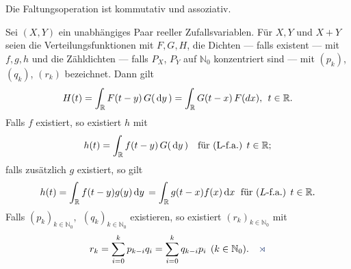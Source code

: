 \begin{prop}
\label{prop:6.8}
\begin{propenum}
\item Die Faltungsoperation ist kommutativ und assoziativ.
\item
Sei $(X,Y)$ ein unabhängiges Paar reeller Zufallsvariablen. Für $X,Y$ und
$X+Y$ seien die Verteilungsfunktionen mit $F,G,H$, die Dichten --- falls existent --- mit
$f,g,h$ und die Zähldichten --- falls $P_{X}$, $P_{Y}$ auf $\mathbb{N}_{0}$
konzentriert sind --- mit $(p_{k})$, $(q_{k})$, $(r_{k})$ bezeichnet. Dann
gilt
\begin{align*}
H(t) = \int_{\mathbb{R}}F(t-y)\,G(\,\mathrm{d} y\,) = \int_{\mathbb{R}}G(t-x)\,F(dx), \;\, t\in
\mathbb{R}.
\end{align*}
Falls $f$ existiert, so existiert $h$ mit
\begin{align*}
h(t) =\int_{\mathbb{R}} f(t-y)\, G(\,\mathrm{d} y\,) \quad  \text{für (L-f.a.) }
t \in \mathbb{R};
\end{align*}
falls zusätzlich $g$ existiert, so gilt
\begin{align*}
h(t) =\int_{\mathbb{R}}f(t-y) g(y)\,\mathrm{d} y\,= \int_{\mathbb{R}}g(t-x) f(x)\,\mathrm{d} x
\text{ \;für ($L$-f.a.) }t\in \mathbb{R}.
\end{align*}
Falls $(p_{k})_{k\in \mathbb{N}_{0}}, \;\, (q_{k})_{k\in \mathbb{N}_{0}}$
existieren, so existiert $(r_{k})_{k\in \mathbb{N}_{0}}$ mit
\begin{align*}
r_{k}= {\displaystyle\sum\limits^ {k}_{i=0}p_{k-i}q_{i}= \sum^
{k}_{i=0}q_{k-i}p_{i} \;\, (k\in \mathbb{N}_{0})}.\fishhere
\end{align*}
\end{propenum}
\end{prop}
